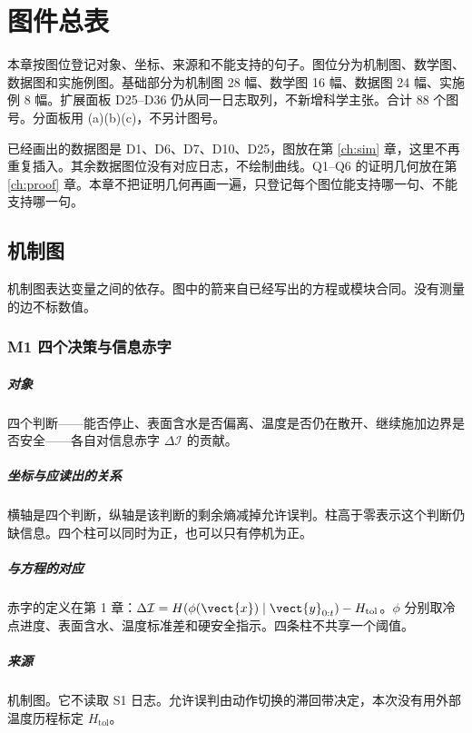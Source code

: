 \chapter{图件总表}
\label{ch:figures}

本章按图位登记对象、坐标、来源和不能支持的句子。图位分为机制图、数学图、数据图和实施例图。基础部分为机制图 28 幅、数学图 16 幅、数据图 24 幅、实施例 8 幅。扩展面板 D25--D36 仍从同一日志取列，不新增科学主张。合计 88 个图号。分面板用 (a)(b)(c)，不另计图号。

已经画出的数据图是 D1、D6、D7、D10、D25，图放在第 \ref{ch:sim} 章，这里不再重复插入。其余数据图位没有对应日志，不绘制曲线。Q1--Q6 的证明几何放在第 \ref{ch:proof} 章。本章不把证明几何再画一遍，只登记每个图位能支持哪一句、不能支持哪一句。
\section{机制图}

机制图表达变量之间的依存。图中的箭来自已经写出的方程或模块合同。没有测量的边不标数值。

\subsection{M1 四个决策与信息赤字}
\paragraph{对象}
四个判断——能否停止、表面含水是否偏离、温度是否仍在散开、继续施加边界是否安全——各自对信息赤字 $\Delta\mathcal{I}$ 的贡献。

\paragraph{坐标与应读出的关系}
横轴是四个判断，纵轴是该判断的剩余熵减掉允许误判。柱高于零表示这个判断仍缺信息。四个柱可以同时为正，也可以只有停机为正。

\paragraph{与方程的对应}
赤字的定义在第 1 章：$\Delta\mathcal{I}=H(\phi(\vect{x})\mid\vect{y}_{0:t})-H_{\mathrm{tol}}$。$\phi$ 分别取冷点进度、表面含水、温度标准差和硬安全指示。四条柱不共享一个阈值。

\paragraph{来源}
机制图。它不读取 S1 日志。允许误判由动作切换的滞回带决定，本次没有用外部温度历程标定 $H_{\mathrm{tol}}$。


